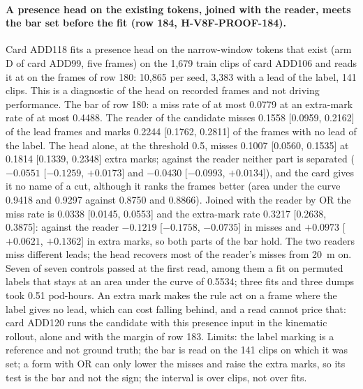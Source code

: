 \paragraph{A presence head on the existing tokens, joined with the reader, meets the bar set before the fit (row 184, H-V8F-PROOF-184).} Card ADD118 fits a presence head on the narrow-window tokens that exist (arm D of card ADD99, five frames) on the 1,679 train clips of card ADD106 and reads it at  on the frames of row 180: 10,865 per seed, 3,383 with a lead of the label, 141 clips. This is a diagnostic of the head on recorded frames and not driving performance. The bar of row 180: a miss rate of at most 0.0779 at an extra-mark rate of at most 0.4488. The reader of the candidate misses 0.1558 [0.0959, 0.2162] of the lead frames and marks 0.2244 [0.1762, 0.2811] of the frames with no lead of the label. The head alone, at the threshold 0.5, misses 0.1007 [0.0560, 0.1535] at 0.1814 [0.1339, 0.2348] extra marks; against the reader neither part is separated ($-0.0551$ [$-0.1259$, $+0.0173$] and $-0.0430$ [$-0.0993$, $+0.0134$]), and the card gives it no name of a cut, although it ranks the frames better (area under the curve 0.9418 and 0.9297 against 0.8750 and 0.8866). Joined with the reader by OR the miss rate is 0.0338 [0.0145, 0.0553] and the extra-mark rate 0.3217 [0.2638, 0.3875]: against the reader $-0.1219$ [$-0.1758$, $-0.0735$] in misses and $+0.0973$ [$+0.0621$, $+0.1362$] in extra marks, so both parts of the bar hold. The two readers miss different leads; the head recovers most of the reader's misses from 20~m on. Seven of seven controls passed at the first read, among them a fit on permuted labels that stays at an area under the curve of 0.5534; three fits and three dumps took 0.51 pod-hours. An extra mark makes the rule act on a frame where the label gives no lead, which can cost falling behind, and a  read cannot price that: card ADD120 runs the candidate with this presence input in the kinematic rollout, alone and with the margin of row 183. Limits: the label marking is a reference and not ground truth; the bar is read on the 141 clips on which it was set; a form with OR can only lower the misses and raise the extra marks, so its test is the bar and not the sign; the interval is over clips, not over fits.


